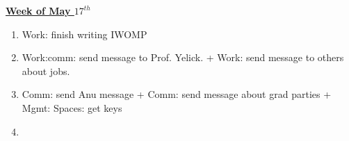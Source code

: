 \documentclass[serif, mathserif, final]{beamer}
\begin{document}
\begin{frame}{}
\begin{columns}
\begin{column}{0.5\linewidth}
\begin{block}{\small \underline{\textbf{Week of May $17^{th}$}}}
\begin{enumerate}
\tiny \item \tiny Work: finish writing IWOMP
\item \tiny Work:comm:  send message to Prof. Yelick.  + Work: send message
  to others about jobs. 

\item \tiny Comm: send Anu message  + Comm: send message about grad
  parties  + Mgmt: Spaces: get keys 
\item \tiny 
\end{enumerate}
\end{block}


\end{column}




\end{columns}
\end{frame}
\end{document}

